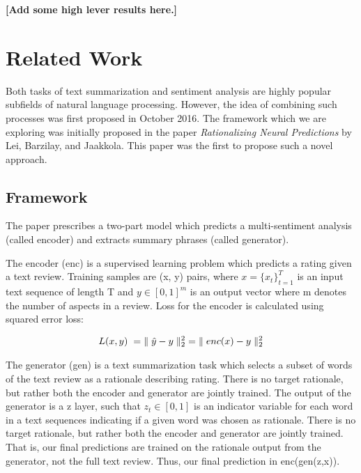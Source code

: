 \documentclass{article} %
\begin{document}
\textbf{[Add some high lever results here.]}

\section{Related Work}

Both tasks of text summarization and sentiment analysis are highly popular subfields of natural language processing. However, the idea of combining such processes was first proposed in October 2016. The framework which we are exploring was initially proposed in the paper \textit{Rationalizing Neural Predictions} by Lei, Barzilay, and Jaakkola. This paper was the first to propose such a novel approach. 

\subsection{Framework}

The paper prescribes a two-part model which predicts a multi-sentiment analysis (called encoder) and extracts summary phrases (called generator). 

The encoder (enc) is a supervised learning problem which predicts a rating given a text review. Training samples are (x, y) pairs,  where $x = \{x_t\}_{t=1}^T$ is an input text sequence of length T and $y \in [0, 1]^m$ is an output vector where m denotes the number of aspects in a review. Loss for the encoder is calculated using squared error loss:

\begin{gather}
L(x,y)\hspace{1mm} = \hspace{1mm}\parallel\hat{y} - y\parallel _2^2  \hspace{1mm} = \hspace{1mm}\parallel enc(x) - y\parallel _2^2
\end{gather}

The generator (gen) is a text summarization task which selects a subset of words of the text review as a rationale describing rating. There is no target rationale, but rather both the encoder and generator are jointly trained. The output of the generator is a z layer, such that $z_t \in [0, 1]$ is an indicator variable for each word in a text sequences indicating if a given word was chosen as rationale. There is no target rationale, but rather both the encoder and generator are jointly trained. That is, our final predictions are trained on the rationale output from the generator, not the full text review. Thus, our final prediction in enc(gen(z,x)). 
\end{document}
